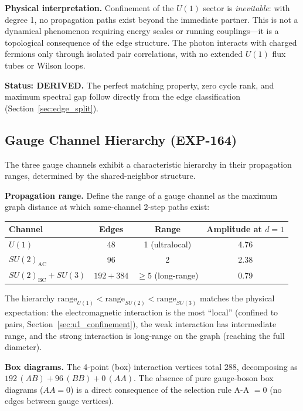 \documentclass[12pt,a4paper]{article}
\begin{document}
\textbf{Physical interpretation.} Confinement of the $U(1)$ sector is \emph{inevitable}: with degree 1, no propagation paths exist beyond the immediate partner. This is not a dynamical phenomenon requiring energy scales or running couplings---it is a topological consequence of the edge structure. The photon interacts with charged fermions only through isolated pair correlations, with no extended $U(1)$ flux tubes or Wilson loops.

\textbf{Status: DERIVED.} The perfect matching property, zero cycle rank, and maximum spectral gap follow directly from the edge classification (Section~\ref{sec:edge_split}).


\subsection{Gauge Channel Hierarchy (EXP-164)}
\label{sec:gauge_hierarchy}

The three gauge channels exhibit a characteristic hierarchy in their propagation ranges, determined by the shared-neighbor structure.

\textbf{Propagation range.} Define the range of a gauge channel as the maximum graph distance at which same-channel 2-step paths exist:
\begin{center}
\begin{tabular}{lccc}
\toprule
\textbf{Channel} & \textbf{Edges} & \textbf{Range} & \textbf{Amplitude at $d=1$} \\
\midrule
$U(1)$ & 48 & 1 (ultralocal) & 4.76 \\
$SU(2)_{\text{AC}}$ & 96 & 2 & 2.38 \\
$SU(2)_{\text{BC}} + SU(3)$ & $192 + 384$ & $\geq 5$ (long-range) & 0.79 \\
\bottomrule
\end{tabular}
\end{center}

The hierarchy $\text{range}_{U(1)} < \text{range}_{SU(2)} < \text{range}_{SU(3)}$ matches the physical expectation: the electromagnetic interaction is the most ``local'' (confined to pairs, Section~\ref{sec:u1_confinement}), the weak interaction has intermediate range, and the strong interaction is long-range on the graph (reaching the full diameter).

\textbf{Box diagrams.} The 4-point (box) interaction vertices total 288, decomposing as $192\,(AB) + 96\,(BB) + 0\,(AA)$. The absence of pure gauge-boson box diagrams ($AA = 0$) is a direct consequence of the selection rule A-A $= 0$ (no edges between gauge vertices).
\end{document}
